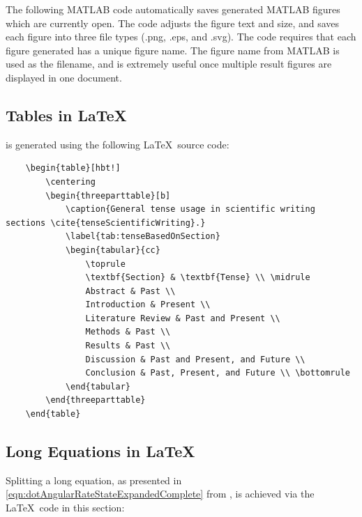 The following MATLAB code automatically saves generated MATLAB figures which are currently open. 
The code adjusts the figure text and size, and saves each figure into three file types (.png, .eps, and .svg). 
The code requires that each figure generated has a unique figure name. The figure name from MATLAB is used as the filename, and is extremely useful once multiple result figures are displayed in one document. \cite{LaTeXSymbols}



\subsection{Tables in \LaTeX} \label{sec:appendixTables}

 is generated using the following \LaTeX\ source code:

\begin{verbatim}
	\begin{table}[hbt!]
		\centering
		\begin{threeparttable}[b]
			\caption{General tense usage in scientific writing sections \cite{tenseScientificWriting}.}
			\label{tab:tenseBasedOnSection}
			\begin{tabular}{cc}
				\toprule
				\textbf{Section} & \textbf{Tense} \\ \midrule
				Abstract & Past \\
				Introduction & Present \\
				Literature Review & Past and Present \\
				Methods & Past \\
				Results & Past \\
				Discussion & Past and Present, and Future \\
				Conclusion & Past, Present, and Future \\ \bottomrule
			\end{tabular}
		\end{threeparttable}
	\end{table}
\end{verbatim}


\subsection{Long Equations in \LaTeX} \label{sec:appendixLongEquation}

Splitting a long equation, as presented in \cref{eqn:dotAngularRateStateExpandedComplete} from \citeauthor{BenThesis} \cite{BenThesis}, is achieved via the \LaTeX\ code in this section:  


